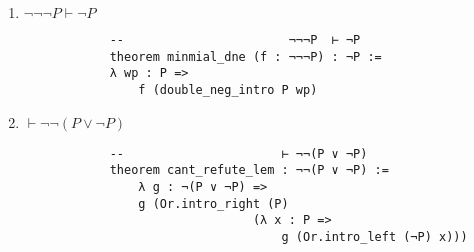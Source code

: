\documentclass[11pt]{report}
\begin{document}
\begin{enumerate}
\begin{enumerate}
			\item $\lnot\lnot\lnot P \vdash \lnot P$
			
			\begin{lstlisting}
			--                       ¬¬¬P  ⊢ ¬P
			theorem minmial_dne (f : ¬¬¬P) : ¬P :=
			λ wp : P =>
				f (double_neg_intro P wp)
			\end{lstlisting}

			\item $ \vdash \lnot \lnot (P \lor \lnot P)$
			
			\begin{lstlisting}
			--                      ⊢ ¬¬(P ∨ ¬P)
			theorem cant_refute_lem : ¬¬(P ∨ ¬P) :=
				λ g : ¬(P ∨ ¬P) =>
				g (Or.intro_right (P) 
								(λ x : P =>
									g (Or.intro_left (¬P) x))) 
			\end{lstlisting}
		\end{enumerate}

\end{enumerate}
	
\end{document}
